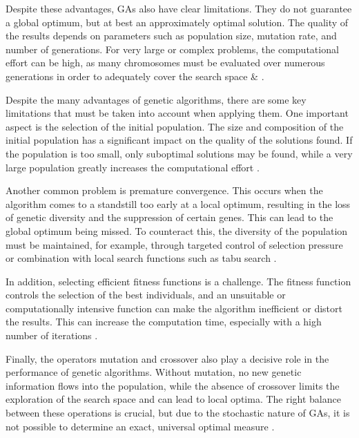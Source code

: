 \documentclass{agasthesis}
\begin{document}
Despite these advantages, GAs also have clear limitations. They do not guarantee a global optimum, but at best an approximately optimal solution. 
The quality of the results depends on parameters such as population size, mutation rate, and number of generations. For very large or complex problems, 
the computational effort can be high, as many chromosomes must be evaluated over numerous generations in order to adequately cover the search space \cite[p. 88]{melanie_introduction_1999} \& \cite{osman_introduction_1995}.

Despite the many advantages of genetic algorithms, there are some key limitations that must be taken into account when applying them. 
One important aspect is the selection of the initial population. The size and composition of the initial population has a significant 
impact on the quality of the solutions found. If the population is too small, only suboptimal solutions may be found, while a very large 
population greatly increases the computational effort \cite[p. 8114–8116]{katoch_review_2021}.

Another common problem is premature convergence. This occurs when the algorithm comes to a standstill too early at a local optimum, 
resulting in the loss of genetic diversity and the suppression of certain genes. This can lead to the global optimum being missed. 
To counteract this, the diversity of the population must be maintained, for example, through targeted control of selection pressure 
or combination with local search functions such as tabu search \cite[p. 8114–8116]{katoch_review_2021}.

In addition, selecting efficient fitness functions is a challenge. The fitness function controls the selection of the best individuals, 
and an unsuitable or computationally intensive function can make the algorithm inefficient or distort the results. This can increase the computation time, 
especially with a high number of iterations \cite[p. 8114–8116]{katoch_review_2021}.

Finally, the operators mutation and crossover also play a decisive role in the performance of genetic algorithms. 
Without mutation, no new genetic information flows into the population, while the absence of crossover limits the exploration 
of the search space and can lead to local optima. The right balance between these operations is crucial, but due to the stochastic nature of GAs, 
it is not possible to determine an exact, universal optimal measure \cite[p. 8114–8116]{katoch_review_2021}.
\end{document}
